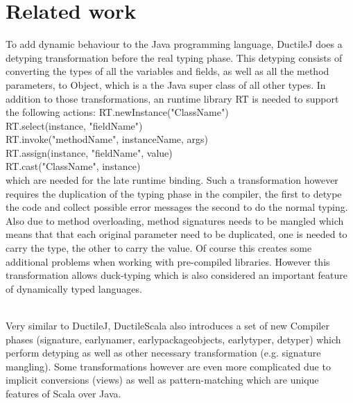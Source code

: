 \section{Related work}


To add dynamic behaviour to the Java programming language, DuctileJ does a detyping transformation before the real typing phase. This detyping consists of converting the types of all the variables and fields, as well as all the method parameters, to {\ttfamily Object}, which is a the Java super class of all other types. In addition to those transformations, an runtime library {\ttfamily RT} is needed to support the following actions:
{\ttfamily
RT.newInstance("ClassName")\\
RT.select(instance, "fieldName")\\
RT.invoke("methodName", instanceName, args)\\
RT.assign(instance, "fieldName", value)\\
RT.cast("ClassName", instance)\\	
}
which are needed for the late runtime binding.
Such a transformation however requires the duplication of the typing phase in the compiler, the first to detype the code and collect possible error messages the second to do the normal typing. Also due to method overloading, method signatures needs to be mangled which means that that each original parameter need to be duplicated, one is needed to carry the type, the other to carry the value. Of course this creates some additional problems when working with pre-compiled libraries. However this transformation allows duck-typing which is also considered an important feature of dynamically typed languages.
\\
\\

Very similar to DuctileJ, DuctileScala also introduces a set of new Compiler phases ({\ttfamily signature, earlynamer, earlypackageobjects, earlytyper, detyper}) which perform detyping as well as other necessary transformation (e.g. signature mangling). Some transformations however are even more complicated due to implicit conversions (views) as well as pattern-matching which are unique features of Scala over Java.
\\
\\


